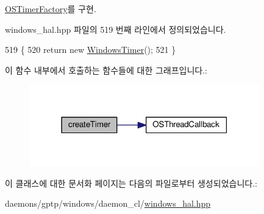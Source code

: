 \hyperlink{class_o_s_timer_factory_a93317f4dabe911276934eeb0a18591a5}{O\+S\+Timer\+Factory}를 구현.



windows\+\_\+hal.\+hpp 파일의 519 번째 라인에서 정의되었습니다.


\begin{DoxyCode}
519                                          \{
520         \textcolor{keywordflow}{return} \textcolor{keyword}{new} \hyperlink{class_windows_timer}{WindowsTimer}();
521     \}
\end{DoxyCode}


이 함수 내부에서 호출하는 함수들에 대한 그래프입니다.\+:
\nopagebreak
\begin{figure}[H]
\begin{center}
\leavevmode
\includegraphics[width=283pt]{class_windows_timer_factory_aa860b8a3f499753959b9148bf48cda4d_cgraph}
\end{center}
\end{figure}




이 클래스에 대한 문서화 페이지는 다음의 파일로부터 생성되었습니다.\+:\begin{DoxyCompactItemize}
\item 
daemons/gptp/windows/daemon\+\_\+cl/\hyperlink{windows__hal_8hpp}{windows\+\_\+hal.\+hpp}\end{DoxyCompactItemize}

